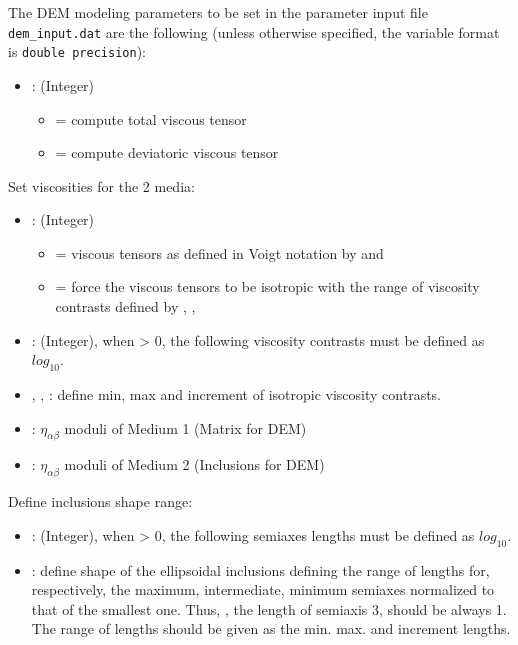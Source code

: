 The DEM modeling parameters to be set in the parameter input file \texttt{dem\_input.dat} are the following (unless otherwise specified, the variable format is \texttt{double precision}):
\begin{itemize}
    \item {}: (Integer) 
    \begin{itemize}
        \item[]  = compute total viscous tensor
        \item[]  = compute deviatoric viscous tensor
    \end{itemize}
\end{itemize}

Set viscosities for the 2 media:
\begin{itemize}

    \item {}: (Integer)  
    \begin{itemize}
        \item[]  = viscous tensors as defined in Voigt notation by  and 
        \item[]  = force the viscous tensors to be isotropic with the range of viscosity contrasts defined by , , 
    \end{itemize}
    \item {}: (Integer), when > 0, the following viscosity contrasts must be defined as $log_{10}$.
    \item {}, , : define min, max and increment of isotropic viscosity contrasts.
    
    \item {}: $\eta_{\alpha\beta}$ moduli of Medium 1 (Matrix for DEM)
    \item {}: $\eta_{\alpha\beta}$ moduli of Medium 2 (Inclusions for DEM)

\end{itemize}

Define inclusions shape range:
\begin{itemize}
    \item {}: (Integer), when > 0, the following semiaxes lengths must be defined as $log_{10}$.
    \item {}: define shape of the ellipsoidal inclusions defining the range of lengths for, respectively, the maximum, intermediate, minimum semiaxes normalized to that of the smallest one. Thus, , the length of semiaxis 3, should be always 1. The range of lengths should be given as the min. max. and increment lengths.
\end{itemize}
    

